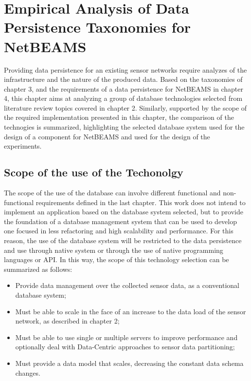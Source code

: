 

\chapter{Empirical Analysis of Data Persistence Taxonomies for NetBEAMS}

Providing data persistence for an existing sensor networks require analyzes of
the infrastructure and the nature of the produced data. Based on the taxonomies
of chapter 3, and the requirements of a data persistence for NetBEAMS in
chapter 4, this chapter aims at analyzing a group of database technologies
selected from literature review topics covered in chapter 2. Similarly,
supported by the scope of the required implementation presented in this
chapter, the comparison of the technogies is summarized, highlighting the
selected database system used for the design of a component for NetBEAMS and
used for the design of the experiments.

\section{Scope of the use of the Techonolgy}

The scope of the use of the database can involve different functional and
non-functional requirements defined in the last chapter. This work does not
intend to implement an application based on the database system selected, but
to provide the foundation of a database management system that can be used to
develop one focused in less refactoring and high scalability and performance.
For this reason, the use of the database system will be restricted to the data
persistence and use through native system or through the use of native
programming languages or API. In this way, the scope of this technology
selection can be summarized as follows:

\begin{itemize}
  \item Provide data management over the collected sensor data, as a
  conventional database system;
  \item Must be able to scale in the face of an increase to the data load of
  the sensor network, as described in chapter 2;
  \item  Must be able to use single or multiple servers to improve performance
  and optionally deal with Data-Centric approaches to sensor data partitioning;
  \item Must provide a data model that scales, decreasing the constant data
  schema changes.
\end{itemize}

